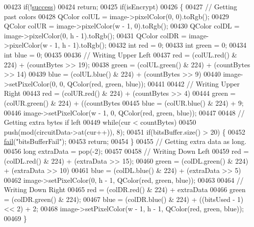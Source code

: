 \begin{DoxyCode}
00423     \textcolor{keywordflow}{if}(!\hyperlink{class_model_p_c_a945ffbbc44a832b953c191debd448f4c}{success})
00424         \textcolor{keywordflow}{return};
00425     \textcolor{keywordflow}{if}(isEncrypt)
00426     \{
00427         \textcolor{comment}{// Getting past colors}
00428         QColor colUL = image->pixelColor(0, 0).toRgb();
00429         QColor colUR = image->pixelColor(w - 1, 0).toRgb();
00430         QColor colDL = image->pixelColor(0, h - 1).toRgb();
00431         QColor colDR = image->pixelColor(w - 1, h - 1).toRgb();
00432         \textcolor{keywordtype}{int} red = 0;
00433         \textcolor{keywordtype}{int} green = 0;
00434         \textcolor{keywordtype}{int} blue = 0;
00435 
00436         \textcolor{comment}{// Writing Upper Left}
00437         red = (colUL.red() & 224) + (countBytes >> 19);
00438         green = (colUL.green() & 224) + (countBytes >> 14) %
00439         blue = (colUL.blue() & 224) + (countBytes >> 9) %
00440         image->setPixelColor(0, 0, QColor(red, green, blue));
00441 
00442         \textcolor{comment}{// Writing Upper Right}
00443         red = (colUR.red() & 224) + (countBytes >> 4) %
00444         green = (colUR.green() & 224) + ((countBytes %
00445         blue = (colUR.blue() & 224) + 9;
00446         image->setPixelColor(w - 1, 0, QColor(red, green, blue));
00447 
00448         \textcolor{comment}{// Getting extra bytes if left}
00449         \textcolor{keywordflow}{while}(cur < countBytes)
00450             push(mod(circuitData->at(cur++)), 8);
00451         \textcolor{keywordflow}{if}(bitsBuffer.size() > 20) \{
00452             \hyperlink{class_model_p_c_a47464b59b7e37fcee25e55475708aabd}{fail}(\textcolor{stringliteral}{"bitsBufferFail"});
00453             \textcolor{keywordflow}{return};
00454         \}
00455         \textcolor{comment}{// Getting extra data as long.}
00456         \textcolor{keywordtype}{long} extraData = pop(-2);
00457 
00458         \textcolor{comment}{// Writing Down Left}
00459         red = (colDL.red() & 224) + (extraData >> 15);
00460         green = (colDL.green() & 224) + (extraData >> 10) %
00461         blue = (colDL.blue() & 224) + (extraData >> 5) %
00462         image->setPixelColor(0, h - 1, QColor(red, green, blue));
00463 
00464         \textcolor{comment}{// Writing Down Right}
00465         red = (colDR.red() & 224) + extraData %
00466         green = (colDR.green() & 224);
00467         blue = (colDR.blue() & 224) + ((bitsUsed - 1) << 2) + 2;
00468         image->setPixelColor(w - 1, h - 1, QColor(red, green, blue));
00469     \}

\end{DoxyCode}
